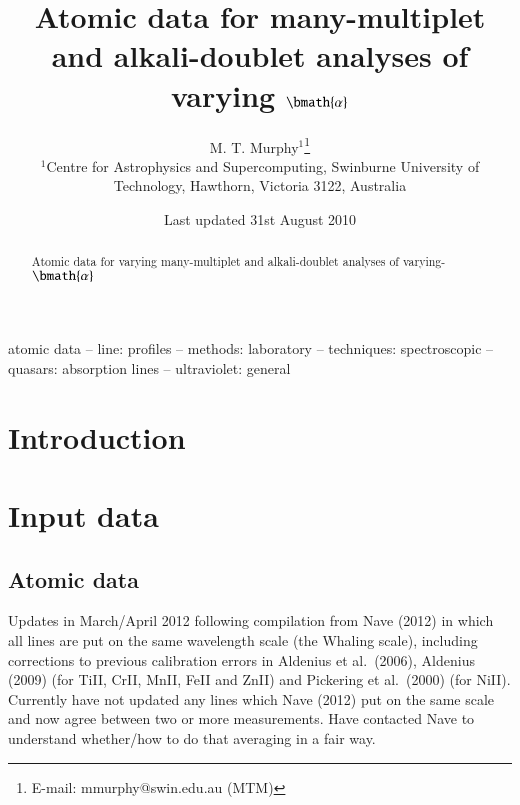 \documentclass[useAMS,usenatbib]{mn2e}
\title[Atomic data for varying $\alpha$ analysis]{Atomic data for
  many-multiplet and alkali-doublet analyses of
  varying $\bmath{\alpha}$}
\author[M. T. Murphy]{
  M. T. Murphy$^{1}$\thanks{E-mail: mmurphy@swin.edu.au (MTM)}\\
  $^{1}$Centre for Astrophysics and Supercomputing, Swinburne
  University of Technology, Hawthorn, Victoria 3122, Australia }
\begin{document}
\date{Last updated 31st August 2010}

\pagerange{\pageref{firstpage}--\pageref{lastpage}} 

\maketitle

\label{firstpage}

\begin{abstract}
  Atomic data for varying many-multiplet and alkali-doublet analyses
  of varying-$\bmath{\alpha}$
\end{abstract}

\begin{keywords}
atomic data -- line: profiles -- methods: laboratory -- techniques:
spectroscopic -- quasars: absorption lines -- ultraviolet: general
\end{keywords}

\section{Introduction}\label{sec:intro}

\section{Input data}\label{sec:data}

\subsection{Atomic data}\label{ssec:atom_dat}

Updates in March/April 2012 following compilation from Nave (2012) in which all lines are put on the same wavelength scale (the Whaling scale), including corrections to previous calibration errors in Aldenius et al.~(2006), Aldenius (2009) (for TiII, CrII, MnII, FeII and ZnII) and Pickering et al.~(2000) (for NiII). Currently have not updated any lines which Nave (2012) put on the same scale and now agree between two or more measurements. Have contacted Nave to understand whether/how to do that averaging in a fair way.


\newcommand\oldtabcolsep{\tabcolsep}
\setlength{\tabcolsep}{0.5em}
\end{document}

